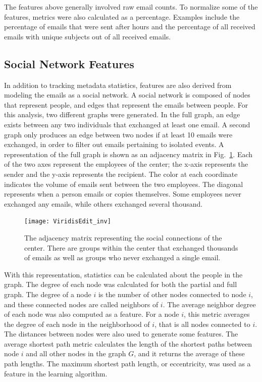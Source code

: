 \documentclass[10pt,twocolumn,conference]{IEEEtran}
\begin{document}
The features above generally involved raw email counts.
To normalize some of the features, metrics were also calculated as a percentage.
Examples include the percentage of emails that were sent after hours and the percentage of all received emails with unique subjects out of all received emails.

\subsection{Social Network Features}
In addition to tracking metadata statistics, features are also derived from modeling the emails as a social network.
A social network is composed of nodes that represent people, and edges that represent the emails between people.  For this analysis, two different graphs were generated.
In the full graph, an edge exists between any two individuals that exchanged at least one email.
A second graph only produces an edge between two nodes if at least 10 emails were exchanged, in order to filter out emails pertaining to isolated events.
A representation of the full graph is shown as an adjacency matrix in Fig.~\ref{fig:adj_matrix}.
Each of the two axes represent the employees of the center; the x-axis represents the sender and the y-axis represents the recipient.
The color at each coordinate indicates the volume of emails sent between the two employees.
The diagonal represents when a person emails or copies themselves.
Some employees never exchanged any emails, while others exchanged several thousand.

\begin{figure}[t]
    \centering
    \texttt{[image: ViridisEdit\_inv]}
    \caption{The adjacency matrix representing the social connections of the center.  There are groups within the center that exchanged thousands of emails as well as groups who never exchanged a single email.}
    \label{fig:adj_matrix}
\end{figure}

With this representation, statistics can be calculated about the people in the graph.
The degree of each node was calculated for both the partial and full graph.
The degree of a node $i$ is the number of other nodes connected to node $i$, and these connected nodes are called neighbors of $i$.
The average neighbor degree of each node was also computed as a feature.
For a node $i$, this metric averages the degree of each node in the neighborhood of $i$, that is all nodes connected to $i$.
The distances between nodes were also used to generate some features.
The average shortest path metric calculates the length of the shortest paths between node $i$ and all other nodes in the graph $G$, and it returns the average of these path lengths.
The maximum shortest path length, or eccentricity, was used as a feature in the learning algorithm.  
\end{document}
